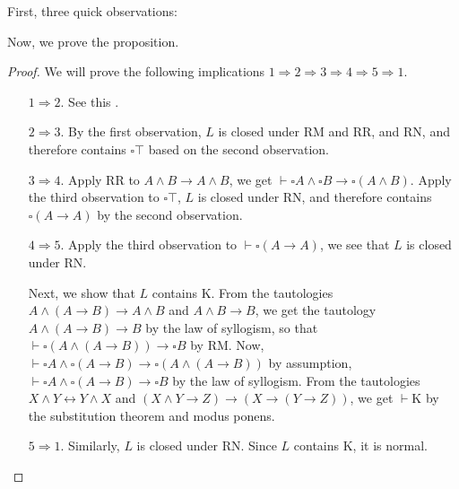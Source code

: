 \documentclass[12pt]{article}
\begin{document}
First, three quick observations:

Now, we prove the proposition.
\begin{proof}  We will prove the following implications $1     $.
\begin{enumerate}
\item[$1 $.] See this .
\item[$2 $.] By the first observation, $L$ is closed under RM and RR, and RN, and therefore contains $\square \top$ based on the second observation.
\item[$3 $.] Apply RR to $A\land B \to A\land B$, we get $\vdash \square A \land \square B \to \square (A\land B)$.  Apply the third observation to $\square \top$, $L$ is closed under RN, and therefore contains $\square (A\to A)$ by the second observation.
\item[$4 $.]  Apply the third observation to $\vdash \square (A\to A)$, we see that $L$ is closed under RN.  

Next, we show that $L$ contains K.  From the tautologies $A \land (A\to B)\to A\land B$ and $A\land B\to B$, we get the tautology $A \land (A\to B)\to B$ by the law of syllogism, so that $\vdash \square (A\land (A\to B)) \to \square B$ by RM.  Now, $\vdash \square A \land \square (A\to B) \to \square (A\land (A\to B))$ by assumption, $\vdash \square A \land \square (A\to B) \to \square B$ by the law of syllogism.  From the tautologies $X\land Y \leftrightarrow Y\land X$ and $(X\land Y \to Z) \to (X \to (Y \to Z))$, we get $\vdash $K by the substitution theorem and modus ponens.
\item[$5 $.]  Similarly, $L$ is closed under RN.  Since $L$ contains K, it is normal.
\end{enumerate}
\end{proof}

\end{document}
